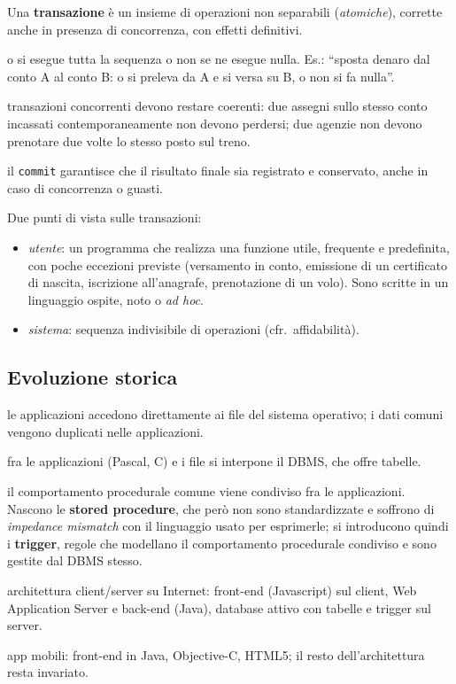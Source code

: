 \documentclass[a4paper,12pt]{article}
\begin{document}
Una \textbf{transazione} è un insieme di operazioni non separabili
(\emph{atomiche}), corrette anche in presenza di concorrenza, con effetti
definitivi.

\begin{description}[style=nextline]
  \item[Atomicità] o si esegue tutta la sequenza o non se ne esegue nulla. Es.:
    ``sposta denaro dal conto A al conto B: o si preleva da A e si versa su B, o
    non si fa nulla''.
  \item[Concorrenza] transazioni concorrenti devono restare coerenti: due assegni
    sullo stesso conto incassati contemporaneamente non devono perdersi; due
    agenzie non devono prenotare due volte lo stesso posto sul treno.
  \item[Durabilità] il \texttt{commit} garantisce che il risultato finale sia
    registrato e conservato, anche in caso di concorrenza o guasti.
\end{description}

Due punti di vista sulle transazioni:
\begin{itemize}
  \item \emph{utente}: un programma che realizza una funzione utile, frequente e
    predefinita, con poche eccezioni previste (versamento in conto, emissione di
    un certificato di nascita, iscrizione all'anagrafe, prenotazione di un volo).
    Sono scritte in un linguaggio ospite, noto o \emph{ad hoc}.
  \item \emph{sistema}: sequenza indivisibile di operazioni (cfr.\ affidabilità).
\end{itemize}

\subsection{Evoluzione storica}

\begin{description}[style=nextline]
  \item[Anni '70 --- nessun DBMS] le applicazioni accedono direttamente ai file
    del sistema operativo; i dati comuni vengono duplicati nelle applicazioni.
  \item[Anni '80 --- primi DBMS] fra le applicazioni (Pascal, C) e i file si
    interpone il DBMS, che offre tabelle.
  \item[Anni '90 --- DBMS attivi] il comportamento procedurale comune viene
    condiviso fra le applicazioni. Nascono le \textbf{stored procedure}, che però
    non sono standardizzate e soffrono di \emph{impedance mismatch} con il
    linguaggio usato per esprimerle; si introducono quindi i \textbf{trigger},
    regole che modellano il comportamento procedurale condiviso e sono gestite
    dal DBMS stesso.
  \item[Anni 2000] architettura client/server su Internet: front-end
    (Javascript) sul client, Web Application Server e back-end (Java), database
    attivo con tabelle e trigger sul server.
  \item[Anni 2010] app mobili: front-end in Java, Objective-C, HTML5; il resto
    dell'architettura resta invariato.
\end{description}
\end{document}

